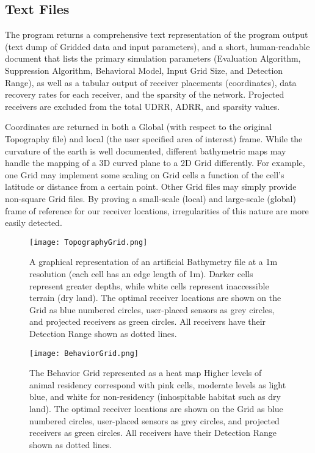 \subsection{Text Files}
The program returns a comprehensive text representation of the program output (text dump of Gridded data and input parameters), and a short, human-readable document that lists the primary simulation parameters (Evaluation Algorithm, Suppression Algorithm, Behavioral Model, Input Grid Size, and Detection Range), as well as a tabular output of receiver placements (coordinates), data recovery rates for each receiver, and the sparsity of the network.  Projected receivers are excluded from the total UDRR, ADRR, and sparsity values.

Coordinates are returned in both a Global (with respect to the original Topography file) and local (the user specified area of interest) frame.  While the curvature of the earth is well documented, different bathymetric maps may handle the mapping of a 3D curved plane to a 2D Grid differently.  For example, one Grid may implement some scaling on Grid cells a function of the cell's latitude or distance from a certain point.  Other Grid files may simply provide non-square Grid files.  By proving a small-scale (local) and large-scale (global) frame of reference for our receiver locations, irregularities of this nature are more easily detected.

\begin{figure}[ht]
	\label{outputGraphs}
	\texttt{[image: TopographyGrid.png]}
	\caption{A graphical representation of an artificial Bathymetry file at a 1m resolution (each cell has an edge length of 1m).  Darker cells represent greater depths, while white cells represent inaccessible terrain (dry land).  The optimal receiver locations are shown on the Grid as blue numbered circles, user-placed sensors as grey circles, and projected receivers as green circles.  All receivers have their Detection Range shown as dotted lines.\label{bathyGraph}}
\end{figure}

\begin{figure}[ht]
	\texttt{[image: BehaviorGrid.png]}
	\caption{The Behavior Grid represented as a heat map  Higher levels of animal residency correspond with pink cells, moderate levels as light blue, and white for non-residency (inhospitable habitat such as  dry land).  The optimal receiver locations are shown on the Grid as blue numbered circles, user-placed sensors as grey circles, and projected receivers as green circles.  All receivers have their Detection Range shown as dotted lines.\label{animalGraph}}
\end{figure}

